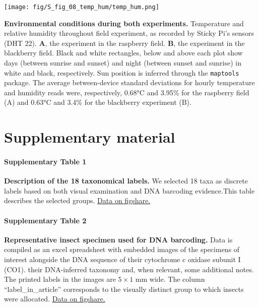 \documentclass[12pt]{article}
\begin{document}
   \begin{supfig}[ht]
	\centering
	\texttt{[image: fig/S\_fig\_08\_temp\_hum/temp\_hum.png]}
	\caption{\textbf{Environmental conditions during both experiments.} Temperature and relative humidity throughout field experiment, as recorded by Sticky Pi's sensors (DHT 22). \textbf{A}, the experiment in the raspberry field. \textbf{B}, the experiment in the blackberry field.
	Black and white rectangles, below and above each plot show days (between sunrise and sunset) and night (between sunset and sunrise) in white and black, respectively. Sun position is inferred through the \texttt{maptools} package\cite{bivand_maptools_2020}.
	The average between-device standard deviations for hourly temperature and humidity reads were, respectively, 0.68°C and 3.95\% for the raspberry field (A) and 0.63°C and 3.4\% for the blackberry experiment (B).
   }
	\label{supfig:08}
	\end{supfig}



	\clearpage
	\newpage
	\section*{Supplementary material}

	\paragraph*{Supplementary Table 1}
	\textbf{Description of the 18 taxonomical labels.} We selected 18 taxa as discrete labels based on both visual examination and DNA barcoding evidence.This table describes the selected groups.
	\href{https://figshare.com/s/999a3b7a3c23a050b106}{Data on figshare.}

	\paragraph*{Supplementary Table 2}
	\textbf{Representative insect specimen used for DNA barcoding.} 
	Data is compiled as an excel spreadsheet with embedded images of the specimens of interest alongside the DNA sequence of their cytochrome c oxidase subunit I (CO1). their DNA-inferred taxonomy and, when relevant, some additional notes. 
	The printed labels in the images are $5 \times{} 1$ mm wide. The column “label\_in\_article” corresponds to the visually distinct group to which insects were allocated.
	\href{https://figshare.com/s/bdb7bef8c26065e3dd17}{Data on figshare.}
\end{document}
